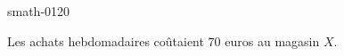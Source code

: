 
\begin{corrige}{smath-0120}

    Les achats hebdomadaires coûtaient \( 70\) euros au magasin \( X\).

\end{corrige}
